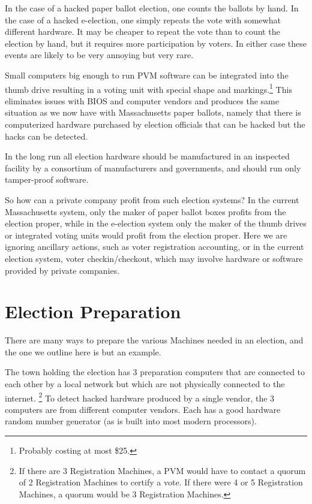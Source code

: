 \documentclass[12pt]{article}
\begin{document}
In the case of a hacked paper ballot election, one counts the
ballots by hand.  In the case of a hacked e-election, one simply
repeats the vote with somewhat different hardware.
It may be cheaper to repeat the vote
than to count the election by hand, but it requires more
participation by voters.  In either case these events are likely
to be very annoying but very rare.

Small computers big enough to run PVM software can be integrated
into the thumb drive resulting in a voting unit with special
shape and markings.\footnote{Probably costing at most \$25.}
This eliminates issues with BIOS and computer
vendors and produces the same situation as we now have with
Massachusetts paper ballots, namely that there is computerized
hardware purchased by election officials that can be hacked but
the hacks can be detected.

In the long run all election hardware should be manufactured in an
inspected facility by a consortium of manufacturers and governments,
and should run only tamper-proof software.

So how can a private company profit from such election systems?
In the current Massachusetts system, only the maker of paper ballot
boxes profits from the election proper, while in the e-election
system only the maker of the thumb drives or integrated voting units
would profit from the election proper.  Here we are ignoring
ancillary actions, such as voter registration accounting, or in
the current election system, voter checkin/checkout, which
may involve hardware or software provided by private companies.




\section{Election Preparation}

There are many ways to prepare the various Machines needed in an election,
and the one we outline here is but an example.

The town holding the election has 3 preparation computers
that are connected to each other by a local network but which are not
physically connected to the internet.%
\footnote{If there are 3 Registration Machines,
a PVM would have to contact a quorum of 2 Registration Machines to
certify a vote.  If there were 4 or 5 Registration Machines,
a quorum would be 3 Registration Machines.}
To detect hacked hardware
produced by a single vendor, the 3 computers are from different
computer vendors.  Each has a good hardware random number generator
(as is built into most modern processors).
\end{document}
